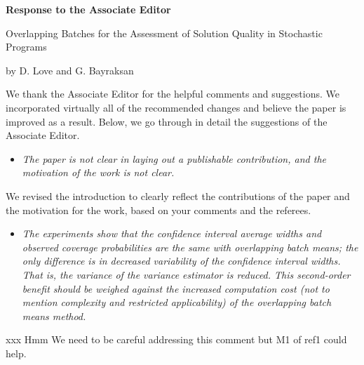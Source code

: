 \documentclass[11pt,notitlepage,onecolumn]{article}
\newcommand{\noi}{\noindent}
\begin{document}

\singlespacing

\baselineskip0.26in


\pagebreak

\begin{center}
\textbf{\Large Response to the Associate Editor} 
\medskip

{\large Overlapping Batches for the Assessment of Solution Quality in Stochastic Programs}
\medskip

{\footnotesize by D. Love and G. Bayraksan}
\end{center}

\bigskip

\bigskip 



We thank the Associate Editor for the helpful comments and suggestions. 
We incorporated virtually all of the recommended changes and believe the paper is improved as a result. 
Below, we go through in detail the suggestions of the Associate Editor.
\medskip


\begin{itemize}
\item[]\textit{The paper is not clear in laying out a publishable contribution, and the motivation of the work is not clear.}
\end{itemize}

\noi
We revised the introduction to clearly reflect the contributions of the paper and the motivation for the work, based on your comments and the referees.
\medskip  

\begin{itemize}
\item[] \textit{The experiments show that the confidence interval average widths and observed coverage probabilities are the same with overlapping batch means; the only difference is in decreased variability of the confidence interval widths. 
That is, the variance of the variance estimator is reduced. 
This second-order benefit should be weighed against the increased computation cost (not to mention complexity and restricted applicability) of the overlapping batch means method.}
\end{itemize}

\noi  
xxx  Hmm We need to be careful addressing this comment but M1 of ref1 could help.
\medskip 
\end{document}

